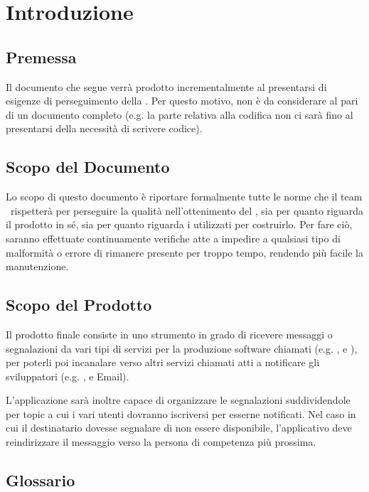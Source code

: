 \section{Introduzione}\label{Introduzione}

    \subsection{Premessa}
    Il documento che segue verrà prodotto incrementalmente al presentarsi di esigenze di perseguimento della .
    Per questo motivo, non è da considerare al pari di un documento completo (e.g. la parte relativa alla codifica non ci sarà fino
    al presentarsi della necessità di scrivere codice).

    \subsection{Scopo del Documento}
    Lo scopo di questo documento è riportare formalmente tutte le norme che il team \gruppo\ rispetterà per perseguire
    la qualità nell'ottenimento del , sia per quanto riguarda il prodotto in s\'e, sia per quanto riguarda i 
    utilizzati per costruirlo. Per fare ciò, saranno effettuate continuamente verifiche atte a impedire a qualsiasi tipo di malformità o errore
    di rimanere presente per troppo tempo, rendendo più facile la manutenzione.

    \subsection{Scopo del Prodotto}
    Il prodotto finale consiste in uno strumento in grado di ricevere messaggi o segnalazioni da vari tipi di servizi per la produzione software chiamati  (e.g. ,  e ), per poterli poi incanalare verso altri servizi chiamati  atti a notificare gli sviluppatori (e.g. ,  e Email).
    
    L'applicazione sarà inoltre capace di organizzare le segnalazioni suddividendole per topic a cui i vari utenti dovranno iscriversi per esserne notificati. Nel caso in cui il destinatario dovesse segnalare di non essere disponibile, l'applicativo deve reindirizzare il messaggio verso la persona di competenza più prossima. 

    \subsection{Glossario}
    


